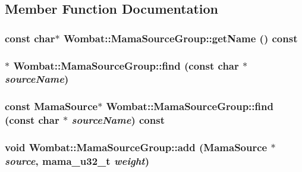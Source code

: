 \subsection{Member Function Documentation}
\hypertarget{classWombat_1_1MamaSourceGroup_a6f567b63e6aa38256ccb61ec8524b968}{
\subsubsection[{getName}]{\setlength{\rightskip}{0pt plus 5cm}const char$\ast$ Wombat::MamaSourceGroup::getName () const}}
\label{classWombat_1_1MamaSourceGroup_a6f567b63e6aa38256ccb61ec8524b968}
\hypertarget{classWombat_1_1MamaSourceGroup_a99200a65fd0890d2bcbc312a501effae}{
\subsubsection[{find}]{$\ast$ Wombat::MamaSourceGroup::find (const char $\ast$ {\em sourceName})}}
\label{classWombat_1_1MamaSourceGroup_a99200a65fd0890d2bcbc312a501effae}
\hypertarget{classWombat_1_1MamaSourceGroup_a89bc61394005ce432c9d3f08da98122f}{
\subsubsection[{find}]{\setlength{\rightskip}{0pt plus 5cm}const {\bf MamaSource}$\ast$ Wombat::MamaSourceGroup::find (const char $\ast$ {\em sourceName}) const}}
\label{classWombat_1_1MamaSourceGroup_a89bc61394005ce432c9d3f08da98122f}
\hypertarget{classWombat_1_1MamaSourceGroup_ac192ef83401db97485842beb0783864b}{
\subsubsection[{add}]{\setlength{\rightskip}{0pt plus 5cm}void Wombat::MamaSourceGroup::add ({\bf MamaSource} $\ast$ {\em source}, \/  mama\_\-u32\_\-t {\em weight})}}
\label{classWombat_1_1MamaSourceGroup_ac192ef83401db97485842beb0783864b}
